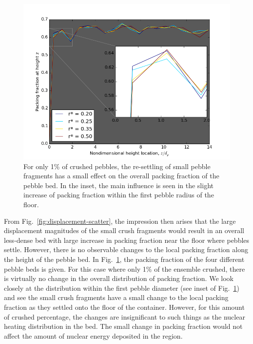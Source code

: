 \begin{figure}[!t]
\centering
    \includegraphics[width=\singleimagewidth]{chapters/figures/crush-fragments/packing-fraction-height.png}
    \caption{For only 1\% of crushed pebbles, the re-settling of small pebble fragments has a small effect on the overall packing fraction of the pebble bed. In the inset, the main influence is seen in the slight increase of packing fraction within the first pebble radius of the floor.}
    \label{fig:fragment-packing-fraction}
\end{figure}

From Fig.~\ref{fig:displacement-scatter}, the impression then arises that the large displacement magnitudes of the small crush fragments would result in an overall less-dense bed with large increase in packing fraction near the floor where pebbles settle. However, there is no observable changes to the local packing fraction along the height of the pebble bed. In Fig.~\ref{fig:fragment-packing-fraction}, the packing fraction of the four different pebble beds is given. For this case where only 1\% of the ensemble crushed, there is virtually no change in the overall distribution of packing fraction. We look closely at the distribution within the first pebble diameter (see inset of Fig.~\ref{fig:fragment-packing-fraction}) and see the small crush fragments have a small change to the local packing fraction as they settled onto the floor of the container. However, for this amount of crushed percentage, the changes are insignificant to such things as the nuclear heating distribution in the bed. The small change in packing fraction would not affect the amount of nuclear energy deposited in the region.


